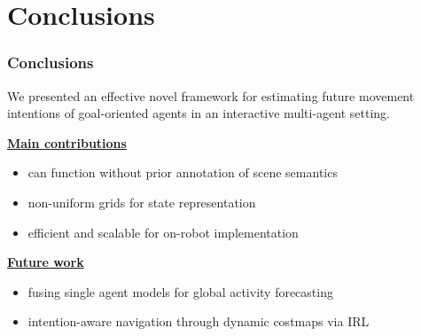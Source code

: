 \section{Conclusions}

\begin{frame}
	\frametitle{Conclusions}
	
	\large
	
	\vspace{0.5cm}
	
	We presented an effective novel framework for estimating future movement intentions of
	goal-oriented agents in an interactive multi-agent setting.
	
	\vspace{0.3cm}
	
	\underline{\textbf{Main contributions}}
	
	\begin{itemize}
		\item can function without prior annotation of scene semantics
		\item non-uniform grids for state representation
		\item efficient and scalable for on-robot implementation
	\end{itemize}
	
	\vspace{0.2cm}
	
	\underline{\textbf{Future work}}
	
	\begin{itemize}
		\item fusing single agent models for global activity forecasting
		\item intention-aware navigation through dynamic costmaps via IRL
	\end{itemize}
\end{frame}
